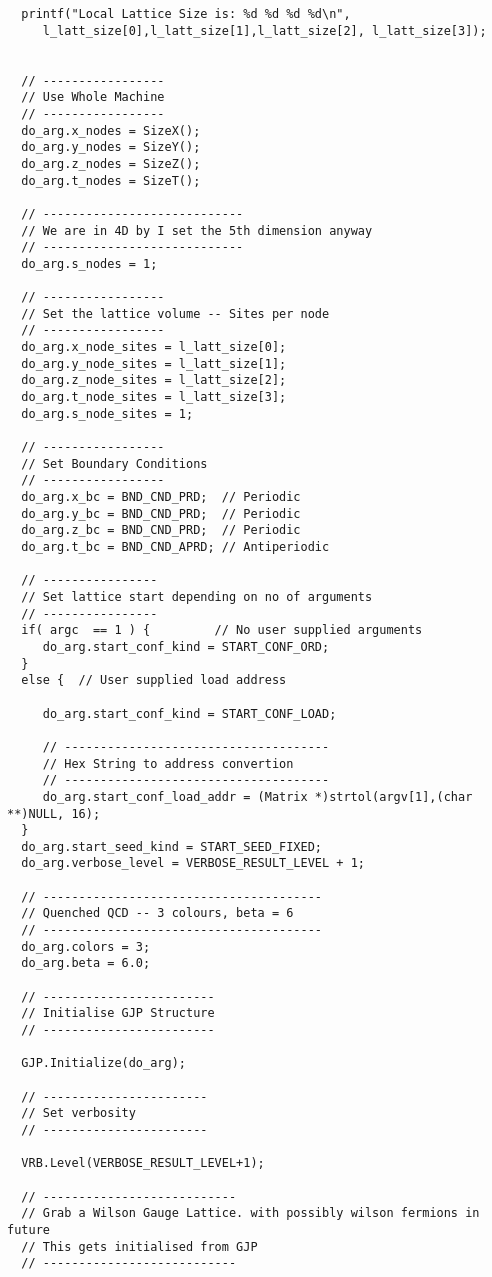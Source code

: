 {\begin{verbatim}
  printf("Local Lattice Size is: %d %d %d %d\n", 
	 l_latt_size[0],l_latt_size[1],l_latt_size[2], l_latt_size[3]);
  

  // -----------------
  // Use Whole Machine
  // -----------------
  do_arg.x_nodes = SizeX();
  do_arg.y_nodes = SizeY();
  do_arg.z_nodes = SizeZ();
  do_arg.t_nodes = SizeT();

  // ----------------------------
  // We are in 4D by I set the 5th dimension anyway
  // ----------------------------
  do_arg.s_nodes = 1;

  // -----------------
  // Set the lattice volume -- Sites per node
  // -----------------
  do_arg.x_node_sites = l_latt_size[0];
  do_arg.y_node_sites = l_latt_size[1];
  do_arg.z_node_sites = l_latt_size[2];
  do_arg.t_node_sites = l_latt_size[3];
  do_arg.s_node_sites = 1;

  // -----------------
  // Set Boundary Conditions
  // -----------------
  do_arg.x_bc = BND_CND_PRD;  // Periodic
  do_arg.y_bc = BND_CND_PRD;  // Periodic
  do_arg.z_bc = BND_CND_PRD;  // Periodic
  do_arg.t_bc = BND_CND_APRD; // Antiperiodic

  // ----------------
  // Set lattice start depending on no of arguments
  // ----------------
  if( argc  == 1 ) {         // No user supplied arguments
     do_arg.start_conf_kind = START_CONF_ORD;
  }
  else {  // User supplied load address
     
     do_arg.start_conf_kind = START_CONF_LOAD;

     // -------------------------------------
     // Hex String to address convertion
     // -------------------------------------
     do_arg.start_conf_load_addr = (Matrix *)strtol(argv[1],(char **)NULL, 16);
  }
  do_arg.start_seed_kind = START_SEED_FIXED;
  do_arg.verbose_level = VERBOSE_RESULT_LEVEL + 1;

  // ---------------------------------------
  // Quenched QCD -- 3 colours, beta = 6
  // --------------------------------------- 
  do_arg.colors = 3;
  do_arg.beta = 6.0;

  // ------------------------
  // Initialise GJP Structure
  // ------------------------

  GJP.Initialize(do_arg);
  
  // -----------------------
  // Set verbosity
  // -----------------------

  VRB.Level(VERBOSE_RESULT_LEVEL+1);

  // ---------------------------
  // Grab a Wilson Gauge Lattice. with possibly wilson fermions in future
  // This gets initialised from GJP
  // ---------------------------


\end{verbatim}}
